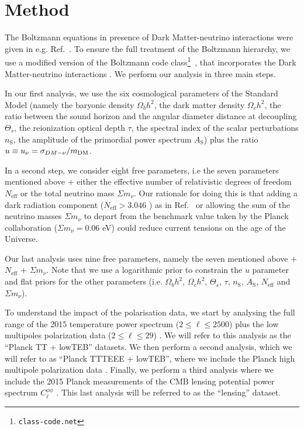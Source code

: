\documentclass[aps,prd,a4paper,twocolumn,amsmath,showpacs,superscriptaddress,nofootinbib,preprintnumbers]{revtex4-1}
\newcommand{\neff}{N_{\mathrm{eff}}}
\newcommand{\mnu}{{\Sigma}m_{\nu}}
\begin{document}
\section{Method \label{sec:method}}

The Boltzmann equations in presence of Dark Matter-neutrino interactions were given in e.g. Ref.~\cite{Mangano:2006mp, Serra:2009uu}.
To ensure the full treatment of the Boltzmann hierarchy,  we use a modified version of the Boltzmann code {\sc class}\footnote{\tt class-code.net}~\cite{Lesgourgues:2011re,Blas:2011rf}, that incorporates the Dark Matter-neutrino interactions \cite{Wilkinson:2014ksa}.
We perform our analysis in three main steps. 

In our first analysis, we use the six cosmological parameters of the Standard Model (namely the baryonic density $\Omega_bh^2$, the dark matter density $\Omega_ch^2$, the ratio between the sound horizon and the angular diameter distance at decoupling $\Theta_{s}$, the reionization optical depth $\tau$, the spectral index of the scalar perturbations $n_\mathrm{S}$, the amplitude of the primordial power spectrum $A_\mathrm{S}$) plus the ratio $u  \equiv u_{\nu}= \sigma_{DM-\nu}/m_{\rm{DM}}$. 


In a second step, we consider eight free parameters, i.e the seven parameters mentioned above $+$ either the effective number of relativistic degrees of freedom $\neff$ or the total neutrino mass $\mnu$. Our rationale for doing this is that adding a dark radiation component ($\neff > 3.046$ \cite{std_neff}) as in Ref.~\cite{Wilkinson:2014ksa,darkradiation,DiValentino:2015sam} or allowing the sum of the neutrino masses $\mnu$ to depart from the benchmark value taken by the Planck collaboration ($\mnu = 0.06$ eV) could reduce current tensions on the age of the Universe. 


Our last analysis uses nine free parameters, namely the seven mentioned above $+$ $\neff$  $+$ $\mnu$. Note that we use a logarithmic prior to constrain the $u$ parameter and  flat priors for the other parameters (i.e. $\Omega_bh^2$, $\Omega_ch^2$, $\Theta_{s}$, $\tau$, $n_\mathrm{S}$, $A_\mathrm{S}$, $\neff$  and $\mnu$).




To understand the impact of the polarisation data, we start by analysing
the full range of the 2015 temperature power spectrum ($2\leq\ell\leq2500$) plus the low multipoles polarization data ($2\leq\ell\leq29$) \cite{Aghanim:2015xee}. We will refer to this analysis as the ``Planck TT + lowTEB'' datasets.  We then perform a second analysis, which we will refer to as  ``Planck TTTEEE + lowTEB'',  where we include the Planck high multipole polarization data \cite{Aghanim:2015xee}. Finally, we perform a third analysis where we include the 2015 Planck measurements of the CMB lensing potential power spectrum $C^{\phi\phi}_\ell$ \cite{Ade:2015zua}. This last analysis will be referred to as the ``lensing'' dataset.
\end{document}
